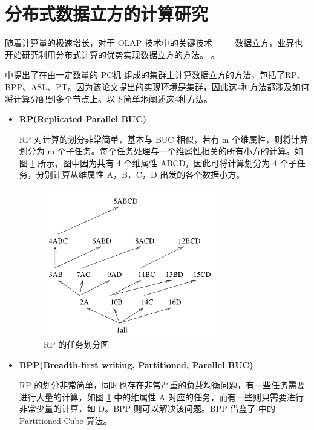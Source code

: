 \section{分布式数据立方的计算研究}

随着计算量的极速增长，对于 OLAP 技术中的关键技术 —— 数据立方，业界也开始研究利用分布式计算的优势实现数据立方的方法。\cite{nandi2011distributed} \cite{dehne2006cgmcube} \cite{ng2001iceberg} \cite{lee2012efficient}。

\cite{ng2001iceberg} 中提出了在由一定数量的 PC机 组成的集群上计算数据立方的方法，包括了RP、BPP、ASL、PT。因为该论文提出的实现环境是集群，因此这4种方法都涉及如何将计算分配到多个节点上。以下简单地阐述这4种方法。

\begin{itemize}

\item \textbf{RP(Replicated Parallel BUC)}

RP 对计算的划分非常简单，基本与 BUC 相似，若有 m 个维属性，则将计算划分为 m 个子任务。每个任务处理与一个维属性相关的所有小方的计算。如图 \ref{cluster_rp} 所示，图中因为共有 4 个维属性 ABCD，因此可将计算划分为 4 个子任务，分别计算从维属性 A，B，C，D 出发的各个数据小方。

\begin{figure}[!htb]
\centering\includegraphics[width=3in]{picture/ch_current_research/cluster_rp} 
\caption{RP 的任务划分图}\label{cluster_rp} 
\end{figure} 

\item \textbf{BPP(Breadth-first writing, Partitioned, Parallel BUC)}

RP 的划分非常简单，同时也存在非常严重的负载均衡问题，有一些任务需要进行大量的计算，如图 \ref{cluster_rp} 中的维属性 A 对应的任务，而有一些则只需要进行非常少量的计算，如 D。BPP 则可以解决该问题。BPP 借鉴了 \cite{ross1997fast} 中的 Partitioned-Cube 算法。


\end{itemize}

